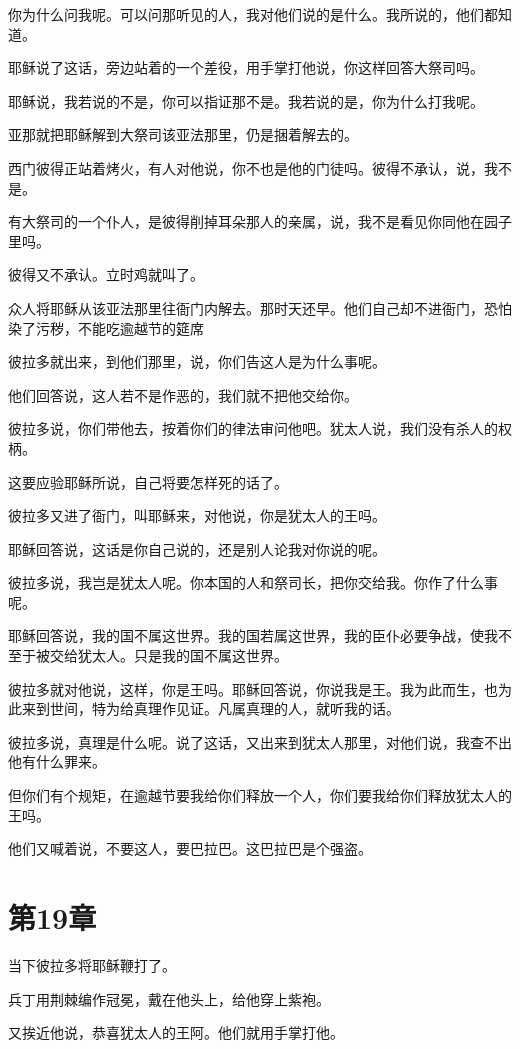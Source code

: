 \documentclass[12pt,oneside]{book}
\begin{document}
你为什么问我呢。可以问那听见的人，我对他们说的是什么。我所说的，他们都知道。

耶稣说了这话，旁边站着的一个差役，用手掌打他说，你这样回答大祭司吗。

耶稣说，我若说的不是，你可以指证那不是。我若说的是，你为什么打我呢。

亚那就把耶稣解到大祭司该亚法那里，仍是捆着解去的。

西门彼得正站着烤火，有人对他说，你不也是他的门徒吗。彼得不承认，说，我不是。

有大祭司的一个仆人，是彼得削掉耳朵那人的亲属，说，我不是看见你同他在园子里吗。

彼得又不承认。立时鸡就叫了。

众人将耶稣从该亚法那里往衙门内解去。那时天还早。他们自己却不进衙门，恐怕染了污秽，不能吃逾越节的筵席

彼拉多就出来，到他们那里，说，你们告这人是为什么事呢。

他们回答说，这人若不是作恶的，我们就不把他交给你。

彼拉多说，你们带他去，按着你们的律法审问他吧。犹太人说，我们没有杀人的权柄。

这要应验耶稣所说，自己将要怎样死的话了。

彼拉多又进了衙门，叫耶稣来，对他说，你是犹太人的王吗。

耶稣回答说，这话是你自己说的，还是别人论我对你说的呢。

彼拉多说，我岂是犹太人呢。你本国的人和祭司长，把你交给我。你作了什么事呢。

耶稣回答说，我的国不属这世界。我的国若属这世界，我的臣仆必要争战，使我不至于被交给犹太人。只是我的国不属这世界。

彼拉多就对他说，这样，你是王吗。耶稣回答说，你说我是王。我为此而生，也为此来到世间，特为给真理作见证。凡属真理的人，就听我的话。

彼拉多说，真理是什么呢。说了这话，又出来到犹太人那里，对他们说，我查不出他有什么罪来。

但你们有个规矩，在逾越节要我给你们释放一个人，你们要我给你们释放犹太人的王吗。

他们又喊着说，不要这人，要巴拉巴。这巴拉巴是个强盗。

\chapter{第19章}
当下彼拉多将耶稣鞭打了。

兵丁用荆棘编作冠冕，戴在他头上，给他穿上紫袍。

又挨近他说，恭喜犹太人的王阿。他们就用手掌打他。
\end{document}
